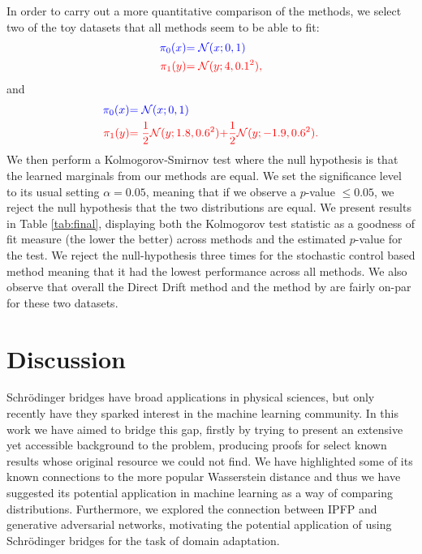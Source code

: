\documentclass[a4paper,12pt,twoside,openright]{report}
\theoremstyle{definition}
\begin{document}
In order to carry out a more quantitative comparison of the methods, we select two of the toy datasets that all methods seem to be able to fit:
\begin{align*}
\color{blue}{\pi_0(x)} &\color{blue}{= {\mathcal{N}}(x; 0,  1)} \\
    \color{red}{\pi_1(y)} &\color{red}{= {\mathcal{N}}(y; 4, 0.1^2)} ,
\end{align*}
and
\begin{align*}
     \color{blue}{\pi_0(x)} &\color{blue}{= {\mathcal{N}}(x; 0,  1)} \\
    \color{red}{\pi_1(y)} &\color{red}{= \frac{1}{2}{\mathcal{N}}(y; 1.8, 0.6 ^2)}\color{red}{ + \frac{1}{2}{\mathcal{N}}(y; -1.9, 0.6 ^2) }.
\end{align*}
We then perform a Kolmogorov-Smirnov \citep{kolmogorov1933sulla} test where the null hypothesis is that the learned marginals from our methods are equal. We set the significance level to its usual setting  $\alpha=0.05$, meaning that if we observe a $p$-value $\leq 0.05$, we reject the null hypothesis that the two distributions are equal. We present results in Table \ref{tab:final}, displaying both the Kolmogorov test statistic as a goodness of fit measure (the lower the better) across methods and the estimated $p$-value for the test. We reject the null-hypothesis three times for the stochastic control based method meaning that it had the lowest performance across all methods. We also observe that overall the Direct Drift method and the method by \cite{pavon2018data} are fairly on-par for these two datasets.
\chapter{Discussion}
Schrödinger bridges have broad applications in physical sciences, but only recently have they sparked interest in the machine learning community.
In this work we have aimed to bridge this gap, firstly by trying to present an extensive yet accessible background to the problem, producing proofs for select known results whose original resource we could not find. We have highlighted some of its known connections to the more popular Wasserstein distance and thus we have suggested its potential application in machine learning as a way of comparing distributions. Furthermore, we explored the connection between IPFP and generative adversarial networks, motivating the potential application of using Schrödinger bridges for the task of domain adaptation.
\end{document}
